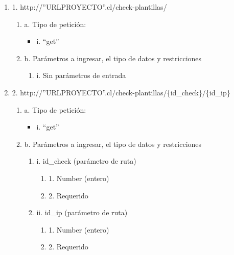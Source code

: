\begin{enumerate}
    \item 1. http://”URLPROYECTO”.cl/check-plantillas/
    \begin{enumerate}
        \item a. Tipo de petición:
            \begin{itemize}
               \item i. “get”
            \end{itemize}
        \item b. Parámetros a ingresar, el tipo de datos y restricciones
            \begin{enumerate}
                \item i. Sin parámetros de entrada
            \end{enumerate}
    \end{enumerate}

    \item 2. http://”URLPROYECTO”.cl/check-plantillas/\{id\_check\}/\{id\_ip\}
    \begin{enumerate}
        \item a. Tipo de petición:
            \begin{itemize}
               \item i. “get”
            \end{itemize}
        \item b. Parámetros a ingresar, el tipo de datos y restricciones
            \begin{enumerate}
                \item i. id\_check (parámetro de ruta)
                    \begin{enumerate}
                        \item 1. Number (entero)
                        \item 2. Requerido
                    \end{enumerate}
                \item ii. id\_ip (parámetro de ruta)
                    \begin{enumerate}
                        \item 1. Number (entero)
                        \item 2. Requerido
                    \end{enumerate}
            \end{enumerate}
    \end{enumerate}


\end{enumerate}
